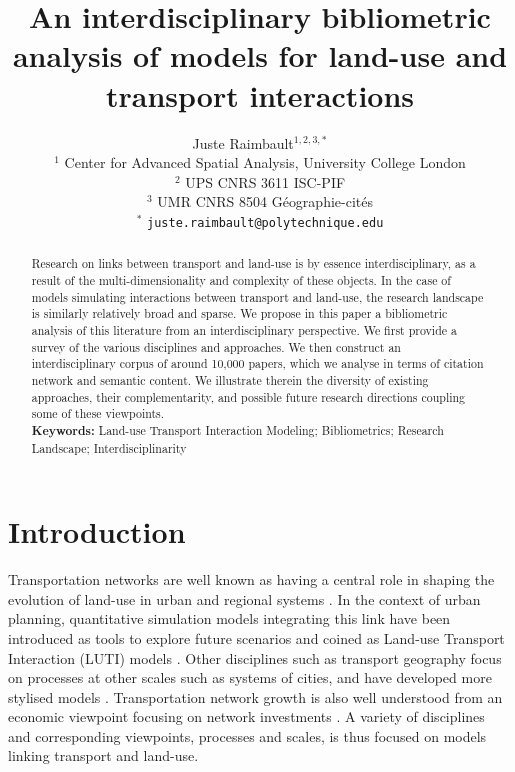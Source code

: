 \documentclass[10pt]{article}
\title{An interdisciplinary bibliometric analysis of models for land-use and transport interactions}
\author{Juste Raimbault$^{1,2,3,\ast}$\medskip\\
$^{1}$ Center for Advanced Spatial Analysis, University College London\\
$^{2}$ UPS CNRS 3611 ISC-PIF\\
$^{3}$ UMR CNRS 8504 G{\'e}ographie-cit{\'e}s\medskip\\
$^{\ast}$ \texttt{juste.raimbault@polytechnique.edu}
}
\date{} %
\begin{document}
\maketitle
\begin{abstract}
Research on links between transport and land-use is by essence interdisciplinary, as a result of the multi-dimensionality and complexity of these objects. In the case of models simulating interactions between transport and land-use, the research landscape is similarly relatively broad and sparse. We propose in this paper a bibliometric analysis of this literature from an interdisciplinary perspective. We first provide a survey of the various disciplines and approaches. We then construct an interdisciplinary corpus of around 10,000 papers, which we analyse in terms of citation network and semantic content. We illustrate therein the diversity of existing approaches, their complementarity, and possible future research directions coupling some of these viewpoints.\medskip\\
\textbf{Keywords: } Land-use Transport Interaction Modeling; Bibliometrics; Research Landscape; Interdisciplinarity
\end{abstract}





\section{Introduction}

Transportation networks are well known as having a central role in shaping the evolution of land-use in urban and regional systems \cite{mackett1993structure}. In the context of urban planning, quantitative simulation models integrating this link have been introduced as tools to explore future scenarios and coined as Land-use Transport Interaction (LUTI) models \cite{wegener2021land}. Other disciplines such as transport geography focus on processes at other scales such as systems of cities, and have developed more stylised models \cite{raimbault2020unveiling}. Transportation network growth is also well understood from an economic viewpoint focusing on network investments \cite{levinson2012forecasting}. A variety of disciplines and corresponding viewpoints, processes and scales, is thus focused on models linking transport and land-use.
\end{document}
